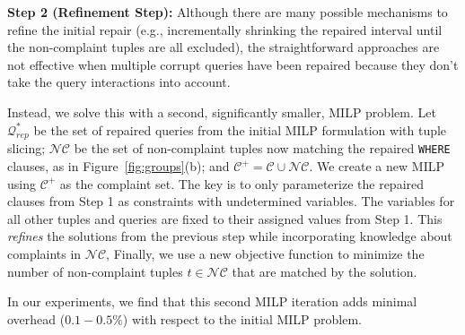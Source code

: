 \smallskip

\noindent\textbf{Step 2 (Refinement Step):} 
Although there are many possible mechanisms to refine the initial repair (e.g., incrementally shrinking
the repaired interval until the non-complaint tuples are all excluded), 
the straightforward approaches are not effective when multiple corrupt 
queries have been repaired because they don't take the query interactions into account.

Instead, we solve this with a second, significantly smaller, MILP problem.   
Let $\mathcal{Q}^*_{rep}$ be the set of repaired queries from the  initial MILP formulation with tuple slicing;
$\mathcal{NC}$ be the set of non-complaint tuples now matching the repaired \texttt{WHERE} clauses, as in Figure~\ref{fig:groups}(b); and $\mathcal{C}^+ = \mathcal{C} \cup \mathcal{NC}$.
We create a new MILP using $\mathcal{C}^+$ as the complaint set.  
The key is to only parameterize the repaired clauses from Step 1 as constraints with undetermined variables.
The variables for all other tuples and queries are fixed to their assigned values from Step 1.
This \emph{refines} the solutions from the previous step while incorporating knowledge about complaints in $\mathcal{NC}$, 
Finally, we use a new objective function to minimize the number of non-complaint tuples 
$t \in \mathcal{NC}$ that are matched by the solution.


In our experiments, we find that this second MILP iteration adds
minimal overhead ($0.1-0.5\%$) with respect to the initial MILP
problem.   





